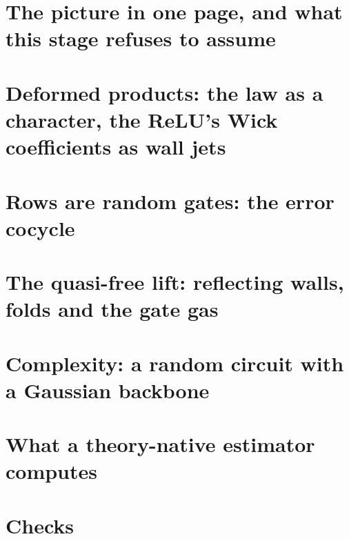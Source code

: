 \documentclass[11pt]{article}
\theoremstyle{plain}
\theoremstyle{definition}\newtheorem{definition}[theorem]{Definition}\newtheorem{remark}[theorem]{Remark}
\begin{document}
\begin{abstract}
\begin{itemize}[leftmargin=*]
removed (that mode is $61\%$ of its error), and to $10\%$ for the exact first-order chain, where the collective mode is already gone.
$79$--$95\%$ of the final error is inherited mean error. $81\%$ of the exact chain's error is born in layers $11$--$16$.
\item \emph{No free lunch for local corrections (proved).} Given the computed state, a birth's anisotropic part has zero conditional
mean. Only its isotropic part is predictable from per-neuron features. This explains stage~9's failed feature regression and bounds
what counterterms can do.
\item \emph{The quasi-free lift.} The fold $|z|$ is the reflecting wall (type~B), and births come only from the fold. The gate gas is the
image of the quasi-free Gaussian field under the sign map: arcsine pairs (Grothendieck--Krivine rounding) plus star cumulants
$-(4/\pi^2)\sum_i\prod_{j\neq i}\rho_{ij}$ (checked to $1$--$7\%$), the same stars as births.
\item \emph{Complexity.} The Gaussian backbone is the Clifford (matchgate) part, folds are magic, and a fold injects $M_\infty=0.188$
units of non-Gaussian energy per unit of field, so $n\,M_\infty/\sqrt{2\pi(1+t)}$ per layer. Generic quantum mean estimation would need
about $5\times$ the closures' budget for all outputs, so the resource being exploited is structure.
\end{itemize}
From these we derive what a theory-native estimator computes: an exact modular sector, an exact linear cocycle, and births computed
where birth $\times$ gain is large, decided per instance. Checks: \texttt{scripts/verify\_stage15.py}.
\end{abstract}
\tableofcontents
\section{The picture in one page, and what this stage refuses to assume}

\section{Deformed products: the law as a character, the ReLU's Wick coefficients as wall jets}

\section{Rows are random gates: the error cocycle}

\section{The quasi-free lift: reflecting walls, folds and the gate gas}

\section{Complexity: a random circuit with a Gaussian backbone}

\section{What a theory-native estimator computes}

\section{Checks}

\end{document}
